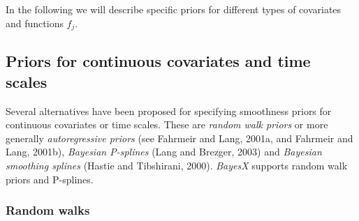In the following we will describe specific priors for different
types of covariates and functions $f_j$.


\subsection{Priors for continuous covariates and time scales}
\label{psplines}

Several alternatives have been  proposed for specifying smoothness
priors for continuous covariates or time scales. These are {\em
random walk priors} or more generally {\em autoregressive priors}
(see Fahrmeir and Lang, 2001a, and Fahrmeir and Lang, 2001b), {\em
Bayesian P-splines} (Lang and Brezger, 2003) and {\em Bayesian
smoothing splines} (Hastie and Tibshirani, 2000). {\em BayesX}
supports random walk priors and P-splines.

\subsubsection{Random walks}

